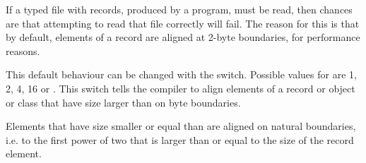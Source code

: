 If a typed file with records, produced by a \tp program, must be read,
then chances are that attempting to read that file correctly will fail.
The reason for this is that by default, elements of a record are aligned at
2-byte boundaries, for performance reasons. 

This default behaviour can be changed with the  
switch. Possible values for  are 1, 2, 4, 16 or .
This switch tells the compiler to align elements of a record or object or
class that have size larger than  on  byte boundaries.

Elements that have size smaller or equal than  are aligned on
natural boundaries, i.e. to the first power of two that is larger than or
equal to the size of the record element.

